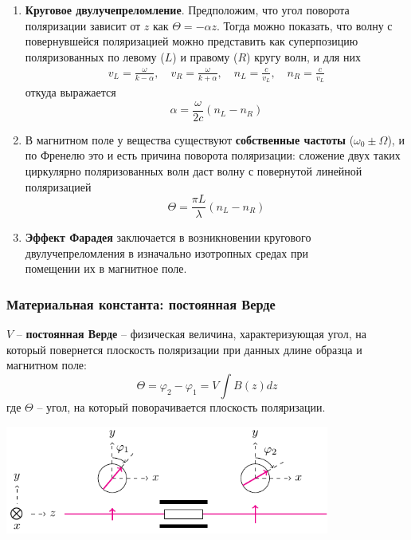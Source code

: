 \documentclass[10pt,pdf,hyperref={unicode}, dvipsnames]{beamer}
\begin{document}

\begin{frame}[t]
	\begin{enumerate}
		\item \textbf{Круговое двулучепреломление}. Предположим, что угол поворота поляризации зависит от $z$ как
		      $\Theta=-\alpha z$. Тогда можно показать, что волну с повернувшейся поляризацией можно представить как суперпозицию поляризованных по левому ($L$) и правому ($R$) кругу волн, и для них
		      \begin{gather*}
			      v_L=\frac{\omega}{k-\alpha},
			      \quad
			      v_R=\frac{\omega}{k+\alpha},
			      \quad
			      n_L=\frac{c}{v_L},
			      \quad
			      n_R=\frac{c}{v_L}
		      \end{gather*}
		      откуда выражается
		      \begin{equation*}
			      \alpha=\frac{\omega}{2c}(n_L-n_R)
		      \end{equation*}
		\item В магнитном поле у вещества существуют \textbf{собственные частоты} ($\omega_0\pm\Omega$),
		      и по Френелю это и есть причина поворота поляризации: сложение двух таких циркулярно поляризованных волн даст волну с повернутой линейной поляризацией
		      \begin{equation*}
			      \Theta=\frac{\pi L}{\lambda}(n_L-n_R)
		      \end{equation*}
		\item \textbf{Эффект Фарадея} заключается в возникновении кругового двулучепреломления в изначально изотропных средах при \\помещении их в магнитное поле.
	\end{enumerate}
\end{frame}


\begin{frame}
	\frametitle{Материальная константа: постоянная Верде}
	$V$ -- \textbf{постоянная Верде} -- физическая величина, характеризующая угол, на который повернется плоскость поляризации при данных длине образца и магнитном поле:
	\begin{equation*}
		\Theta=\varphi_2-\varphi_1=V \int B(z)dz
	\end{equation*}
	где $\Theta$ -- угол, на который поворачивается плоскость поляризации.
	\begin{center}
		\includegraphics[width=0.8\textwidth]{images/rotpol}
	\end{center}
\end{frame}
\end{document}
